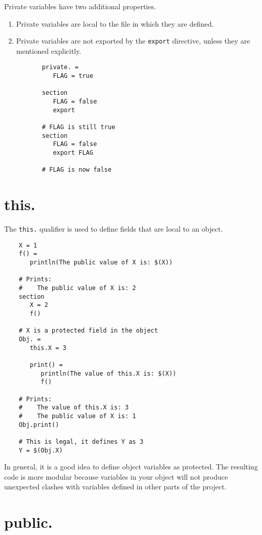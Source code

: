 Private variables have two additional properties.

\begin{enumerate}
\item Private variables are local to the file in which they are defined.
\item Private variables are not exported by the \verb+export+ directive, unless they are
  mentioned explicitly.

  \begin{verbatim}
       private. =
          FLAG = true

       section
          FLAG = false
          export

       # FLAG is still true
       section
          FLAG = false
          export FLAG

       # FLAG is now false
  \end{verbatim}
\end{enumerate}

\section{this.}

The \verb+this.+ qualifier is used to define fields that are local to an object.

\begin{verbatim}
    X = 1
    f() =
       println(The public value of X is: $(X))

    # Prints:
    #    The public value of X is: 2
    section
       X = 2
       f()

    # X is a protected field in the object
    Obj. =
       this.X = 3

       print() =
          println(The value of this.X is: $(X))
          f()

    # Prints:
    #    The value of this.X is: 3
    #    The public value of X is: 1
    Obj.print()

    # This is legal, it defines Y as 3
    Y = $(Obj.X)
\end{verbatim}

In general, it is a good idea to define object variables as protected.  The resulting code is more
modular because variables in your object will not produce unexpected clashes with variables defined
in other parts of the project.

\section{public.}
\label{section:public}

